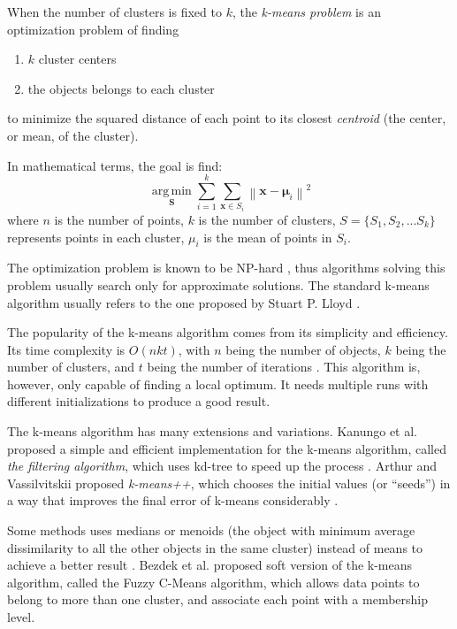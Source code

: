 \documentclass[conference]{IEEEtran}
\begin{document}
When the number of clusters is fixed to $k$, the \textit{k-means problem} is an optimization problem of finding
\begin{enumerate}
\item $k$ cluster centers
\item the objects belongs to each cluster
\end{enumerate}
to minimize the squared distance of each point to its closest \textit{centroid} (the center, or mean, of the cluster).

In mathematical terms, the goal is find:
$$ \underset{\mathbf{S}}{\operatorname{arg\,min}} \sum_{i=1}^{k} \sum_{\mathbf x \in S_i} \left\| \mathbf x - \boldsymbol\mu_i \right\|^2
$$
where $n$ is the number of points, $k$ is the number of clusters, $S = \{S_1, S_2, ... S_k\}$ represents points in each cluster, $\mu_i$ is the mean of points in $S_i$.

The optimization problem is known to be NP-hard \cite{mahajan2009planar}, thus algorithms solving this problem usually search only for approximate solutions. The standard k-means algorithm usually refers to the one proposed by Stuart P. Lloyd \cite{lloyd1982least}.

The popularity of the k-means algorithm comes from its simplicity and efficiency. Its time complexity is $O(nkt)$, with $n$ being the number of objects, $k$ being the number of clusters, and $t$ being the number of iterations \cite{dong2009k}. This algorithm is, however, only capable of finding a local optimum. It needs multiple runs with different initializations to produce a good result.

The k-means algorithm has many extensions and variations. Kanungo et al. proposed a simple and efficient implementation for the k-means algorithm, called \textit{the filtering algorithm}, which uses kd-tree to speed up the process \cite{kanungo2002efficient}. Arthur and Vassilvitskii proposed \textit{k-means++}, which chooses the initial values (or ``seeds'') in a way that improves the final error of k-means considerably \cite{arthur2007k}.

Some methods uses medians or menoids (the object with minimum average dissimilarity to all the other objects in the same cluster) instead of means to achieve a better result \cite{huang1998extensions}. Bezdek et al. proposed soft version of the k-means algorithm, called the Fuzzy C-Means algorithm, which allows data points to belong to more than one cluster, and associate each point with a membership level.
\end{document}
